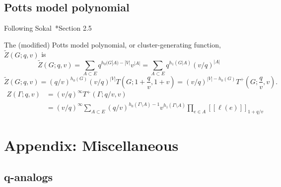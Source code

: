 \documentclass{amsart}
\theoremstyle{definition}
\newcommand{\fanalog}[2]{[\![#2]\!]_{#1}}
\begin{document}
\subsection{Potts model polynomial}

Following Sokal~\cite{Sok-potts}*{Section 2.5}

The (modified) Potts model polynomial, or cluster-generating function, $\widetilde Z(G; q,v)$ is
\[
	\widetilde Z(G; q, v) = \sum_{A \subset E} q^{h_0(G|A) - |V|} v^{|A|}
	= \sum_{A \subset E} q^{h_1(G|A)} (v/q)^{|A|}
\]
\[
	\widetilde Z(G; q,v) = (q/v)^{h_0(G)} (v/q)^{|V|} T(G; 1 + \frac{q}{v}, 1 + v) 
	= (v/q)^{|V| - h_0(G)} T^+(G; \frac{q}{v}, v) .
\]
\begin{align*}
	Z(\Gamma; q, v) &= (v/q)^{\infty} T^+(\Gamma; q/v, v) \\
	&= (v/q)^{\infty} \sum_{A \subset E} (q/v)^{h_0(\Gamma \setminus A) - 1} v^{h_1(\Gamma \setminus A)} \prod_{e \in A} \fanalog{1 + q/v}{\ell(e)}
\end{align*}

\section*{Appendix: Miscellaneous}

\subsection{q-analogs}
\end{document}
